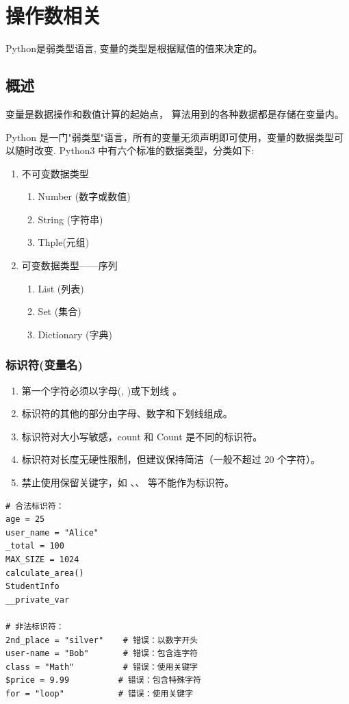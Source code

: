 \chapter{操作数相关}
Python是弱类型语言, 变量的类型是根据赋值的值来决定的。

\section{概述}
变量是数据操作和数值计算的起始点，
算法用到的各种数据都是存储在变量内。

Python 是一门"弱类型"语言，所有的变量无须声明即可使用，变量的数据类型可以随时改变. 
Python3 中有六个标准的数据类型，分类如下:
\begin{enumerate}[label=\arabic*)]
    \item 不可变数据类型
    \begin{enumerate}[itemindent=1em,label=\arabic*)]
        \item Number (数字或数值)
        \item String (字符串)
        \item Thple(元组)
    \end{enumerate}
    
    
    \item 可变数据类型——序列
    \begin{enumerate}[itemindent=1em,label=\arabic*)]
        \item List (列表)
        \item Set (集合)
        \item Dictionary (字典)
    \end{enumerate}
\end{enumerate}

\subsection{标识符(变量名)}
\begin{enumerate}[label=\arabic*)]
    \item 第一个字符必须以字母(, )或下划线 \codeinline{\_} 。
    \item 标识符的其他的部分由字母、数字和下划线组成。
    \item 标识符对大小写敏感，count 和 Count 是不同的标识符。
    \item 标识符对长度无硬性限制，但建议保持简洁（一般不超过 20 个字符）。
    \item 禁止使用保留关键字，如 、、 等不能作为标识符。
\end{enumerate}
\begin{lstlisting}[style=demostyle,numbers=none]
# 合法标识符：    
age = 25
user_name = "Alice"
_total = 100
MAX_SIZE = 1024
calculate_area()
StudentInfo
__private_var

# 非法标识符：
2nd_place = "silver"    # 错误：以数字开头
user-name = "Bob"       # 错误：包含连字符
class = "Math"          # 错误：使用关键字
$price = 9.99          # 错误：包含特殊字符
for = "loop"           # 错误：使用关键字
\end{lstlisting}


